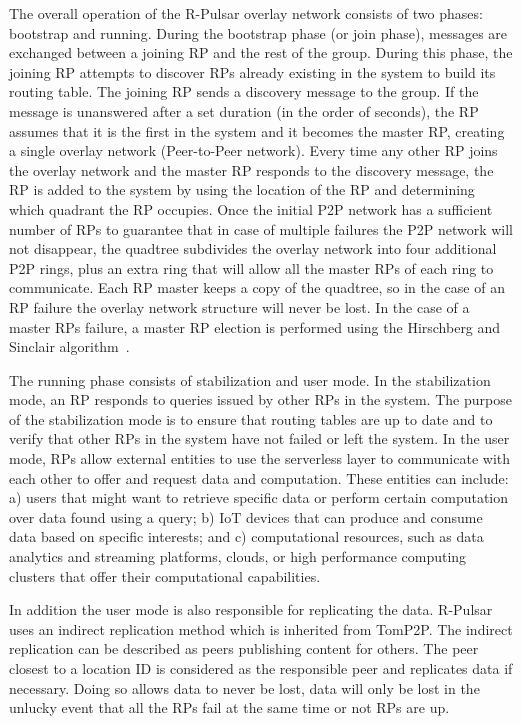 The overall operation of the R-Pulsar overlay network consists of two phases: bootstrap and running. During the bootstrap phase (or join phase), messages are exchanged between a joining RP and the rest of the group. During this phase, the joining RP attempts to discover RPs already existing in the system to build its routing table. The joining RP sends a discovery message to the group. If the message is unanswered after a set duration (in the order of seconds), the RP assumes that it is the first in the system and it becomes the master RP, creating a single overlay network (Peer-to-Peer network). Every time any other RP joins the overlay network and the master RP responds to the discovery message, the  RP is added to the system by using the location of the RP and determining which quadrant the RP occupies. Once the initial P2P network has a sufficient number of RPs to guarantee that in case of multiple failures the P2P network will not disappear, the quadtree subdivides the overlay network into four additional P2P rings, plus an extra ring that will allow all the master RPs of each ring to communicate. Each RP master keeps a copy of the quadtree, so in the case of an RP failure the overlay network structure will never be lost. In the case of a master RPs failure, a master RP election is performed using the Hirschberg and Sinclair algorithm~\cite{Hirschberg}.

The running phase consists of stabilization and user mode. In the stabilization mode, an RP responds to queries issued by other RPs in the system. The purpose of the stabilization mode is to ensure that routing tables are up to date and to verify that other RPs in the system have not failed or left the system. In the user mode, RPs allow external entities to use the serverless layer to communicate with each other to offer and request data and computation. These entities can include: a) users that might want to retrieve specific data or perform certain computation over data found using a query; b) IoT devices that can produce and consume data based on specific interests; and c) computational resources, such as data analytics and streaming platforms, clouds, or high performance computing clusters that offer their computational capabilities.

In addition the user mode is also responsible for replicating the data. R-Pulsar uses an indirect replication method which is inherited from TomP2P. The indirect replication can be described as peers publishing content for others. The peer closest to a location ID is considered as the responsible peer and replicates data if necessary. Doing so allows data to never be lost, data will only be lost in the unlucky event that all the RPs fail at the same time or not RPs are up.

